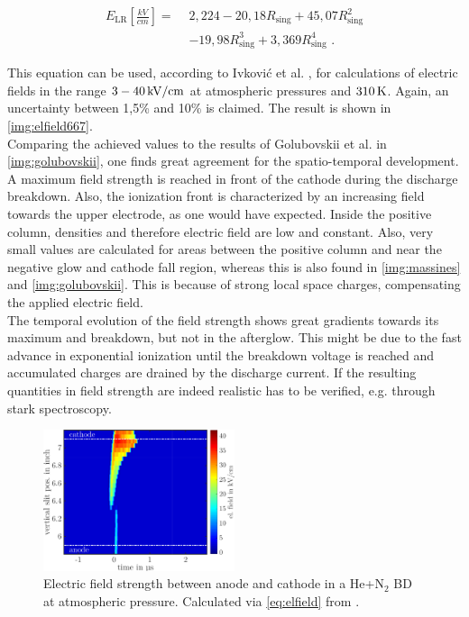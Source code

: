 \documentclass[a4paper,10pt,twoside]{article}
\newcommand{\ix}[1]{_\text{#1}}
\begin{document}
			\begin{align}
				E\ix{LR}\left[\frac{kV}{cm}\right] =\,\, &2,224-20,18R\ix{sing}+45,07R\ix{sing}^2 \nonumber \\ 
				&-19,98R\ix{sing}^3+3,369R\ix{sing}^4\,\,. \label{eq:elfield}
			\end{align}
				
		This equation can be used, according to Ivkovi{\'c} et al. \cite{linratio1_14}, for calculations of electric fields in the range $\unit[3-40]{kV/cm}$ at atmospheric pressures and $\unit[310]{K}$. Again, an uncertainty between 1,5\% \newline and 10\% is claimed. The result is shown in \autoref{img:elfield667}.\\
		Comparing the achieved values to the results of Golubovskii et al. \cite{0022-3727-36-1-306} in \autoref{img:golubovskii}, one finds great agreement for the spatio-temporal development. A maximum field strength is reached in front of the cathode during the discharge breakdown. Also, the ionization front is characterized by an increasing field towards the upper electrode, as one would have expected. Inside the positive column, densities and therefore electric field are low and constant. Also, very small values are calculated for areas between the positive column and near the negative glow and cathode fall region, whereas this is also found in \autoref{img:massines} and \autoref{img:golubovskii}. This is because of strong local space charges, compensating the applied electric field.\\
		The temporal evolution of the field strength shows great gradients towards its maximum and breakdown, but not in the afterglow. This might be due to the fast advance in exponential ionization until the breakdown voltage is reached and accumulated charges are drained by the discharge current. If the resulting quantities in field strength are indeed realistic has to be verified, e.g. through stark spectroscopy.
				
				\begin{figure}[t!]
					\centering
					\hspace{0.5cm}\includegraphics[width=0.5\textwidth]{figures/lineratio/combinations/electricfield667.pdf}
					\caption{Electric field strength between anode and cathode in a He+N$_2$ BD at atmospheric pressure. Calculated via \autoref{eq:elfield} from \cite{linratio1_14}.}
					\label{img:elfield667}
				\end{figure}
\end{document}
